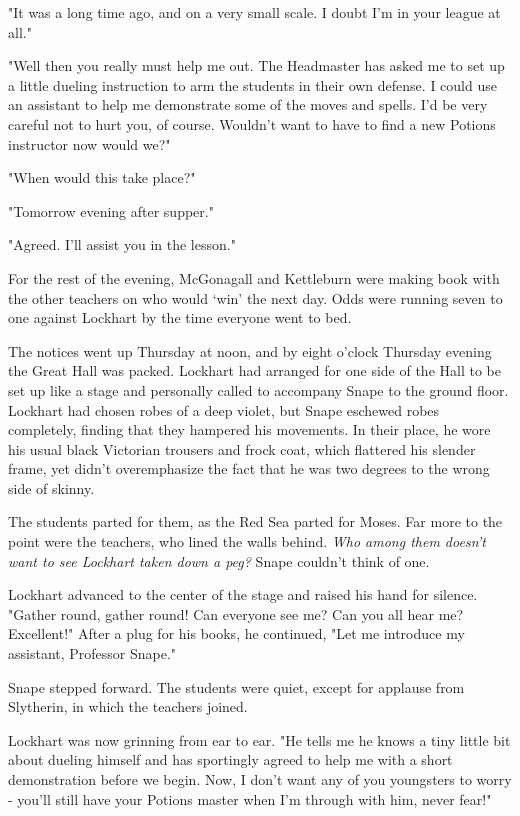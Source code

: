 \documentclass[a4paper,11pt]{article}
\begin{document}
"It was a long time ago, and on a very small scale. I doubt I'm in your league at all."

"Well then you really must help me out. The Headmaster has asked me to set up a little dueling instruction to arm the students in their own defense. I could use an assistant to help me demonstrate some of the moves and spells. I'd be very careful not to hurt you, of course. Wouldn't want to have to find a new Potions instructor now would we?"

"When would this take place?"

"Tomorrow evening after supper."

"Agreed. I'll assist you in the lesson."

For the rest of the evening, McGonagall and Kettleburn were making book with the other teachers on who would `win' the next day. Odds were running seven to one against Lockhart by the time everyone went to bed.

The notices went up Thursday at noon, and by eight o'clock Thursday evening the Great Hall was packed. Lockhart had arranged for one side of the Hall to be set up like a stage and personally called to accompany Snape to the ground floor. Lockhart had chosen robes of a deep violet, but Snape eschewed robes completely, finding that they hampered his movements. In their place, he wore his usual black Victorian trousers and frock coat, which flattered his slender frame, yet didn't overemphasize the fact that he was two degrees to the wrong side of skinny.

The students parted for them, as the Red Sea parted for Moses. Far more to the point were the teachers, who lined the walls behind. \emph{Who among them doesn't want to see Lockhart taken down a peg?} Snape couldn't think of one.

Lockhart advanced to the center of the stage and raised his hand for silence. "Gather round, gather round! Can everyone see me? Can you all hear me? Excellent!" After a plug for his books, he continued, "Let me introduce my assistant, Professor Snape."

Snape stepped forward. The students were quiet, except for applause from Slytherin, in which the teachers joined.

Lockhart was now grinning from ear to ear. "He tells me he knows a tiny little bit about dueling himself and has sportingly agreed to help me with a short demonstration before we begin. Now, I don't want any of you youngsters to worry - you'll still have your Potions master when I'm through with him, never fear!"
\end{document}
